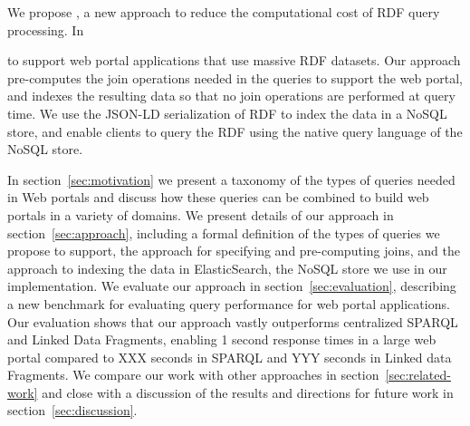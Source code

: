 We propose \ldjoins, a new approach to reduce the computational cost of RDF query processing.
In \ldviews

to support web portal applications that use massive RDF datasets.
Our approach pre-computes the join operations needed in the queries to support the web portal, and indexes the resulting data so that no join operations are performed at query time.
We use the JSON-LD serialization of RDF \cite{Lanthaler:2012:UJC:2307819.2307827} to index the data in a NoSQL store, and enable clients to query the RDF using the native query language of the NoSQL store.

In section~\ref{sec:motivation} we present a taxonomy of the types of queries needed in Web portals and discuss how these queries can be combined to build web portals in a variety of domains.
We present details of our approach in section~\ref{sec:approach}, including a formal definition of the types of queries we propose to support, the approach for specifying and pre-computing joins, and the approach to indexing the data in ElasticSearch, the NoSQL store we use in our implementation.
We evaluate our approach in section~\ref{sec:evaluation}, describing a new benchmark for evaluating query performance for web portal applications. 
Our evaluation shows that our approach vastly outperforms centralized SPARQL and Linked Data Fragments, enabling 1 second response times in a large web portal compared to XXX seconds in SPARQL and YYY seconds in Linked data Fragments.
We compare our work with other approaches in section~\ref{sec:related-work} and close with a discussion of the results and directions for future work in section~\ref{sec:discussion}.
